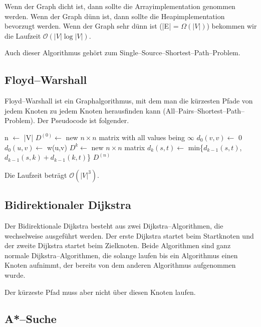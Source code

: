 \documentclass[10pt,a4paper,oneside,ngerman,numbers=noenddot]{scrartcl}
\begin{document}
		Wenn der Graph dicht ist, dann sollte die Arrayimplementation genommen werden. Wenn der Graph dünn ist, dann sollte die Heapimplementation bevorzugt werden. Wenn der Graph sehr dünn ist (|E| = $\Omega(|V|)$) bekommen wir die Laufzeit $\mathcal{O}(|V| \log |V|)$.
		
		Auch dieser Algorithmus gehört zum Single--Source--Shortest--Path--Problem.
	
	\subsection{Floyd--Warshall}
	
		Floyd--Warshall ist ein Graphalgorithmus, mit dem man die kürzesten Pfade von jedem Knoten zu jedem Knoten herausfinden kann (All--Pairs--Shortest--Path--Problem). Der Pseudocode ist folgender.
		
		\begin{algorithmic}[1]
				\State n $\gets$ |V|
				\State $D^{(0)} \gets$ new $n \times n$ matrix with all values being $\infty$
					 \State $d_{0}(v,v) \gets$ 0
				\EndFor
					\State $d_{0}(u,v) \gets$ w(u,v)
				\EndFor
					\State $D^{k} \gets$ new $n \times n$ matrix
							\State $d_{k}(s, t) \gets$ min\{$d_{k-1}(s, t)$, $d_{k-1}(s, k) + d_{k-1}(k, t)$\}
						\EndFor
					\EndFor
				\EndFor
				\State \Return $D^{(n)}$
			\EndFunction
		\end{algorithmic}
		
		Die Laufzeit beträgt $\mathcal{O}(|V|^{3})$.
		
	\subsection{Bidirektionaler Dijkstra}
	
		Der Bidirektionale Dijkstra besteht aus zwei Dijkstra--Algorithmen, die wechselweise ausgeführt werden. Der erste Dijkstra startet beim Startknoten und der zweite Dijkstra startet beim Zielknoten. Beide Algorithmen sind ganz normale Dijkstra--Algorithmen, die solange laufen bis ein Algorithmus einen Knoten aufnimmt, der bereits von dem anderen Algorithmus aufgenommen wurde.
		
		Der kürzeste Pfad muss aber nicht über diesen Knoten laufen.
	
	\subsection{A*--Suche}
	
\end{document}
